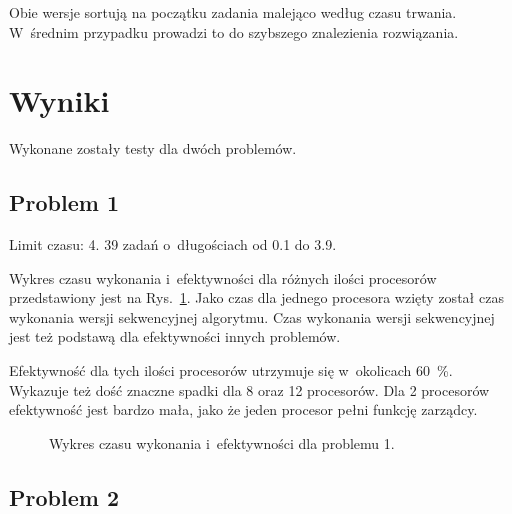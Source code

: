 \documentclass[a4paper; 12pt]{article}
\begin{document}
Obie wersje sortują na początku zadania malejąco według czasu trwania.
W~średnim przypadku prowadzi to do szybszego znalezienia rozwiązania.


\section{Wyniki}

Wykonane zostały testy dla dwóch problemów.

\subsection{Problem 1}

Limit czasu: 4.
39 zadań o~długościach od \num{0.1} do \num{3.9}.

Wykres czasu wykonania i~efektywności dla różnych ilości procesorów
przedstawiony jest na Rys.~\ref{fig:problem1}.
Jako czas dla jednego procesora wzięty został czas wykonania wersji
sekwencyjnej algorytmu.
Czas wykonania wersji sekwencyjnej jest też podstawą dla efektywności innych
problemów.

Efektywność dla tych ilości procesorów utrzymuje się w~okolicach
\SI{60}{\percent}.
Wykazuje też dość znaczne spadki dla 8 oraz 12 procesorów.
Dla 2 procesorów efektywność jest bardzo mała, jako że jeden procesor pełni
funkcję zarządcy.

\begin{figure}[h]
    \centering
    \caption{Wykres czasu wykonania i~efektywności dla problemu 1.}
    \label{fig:problem1}
\end{figure}

\subsection{Problem 2}
\end{document}
